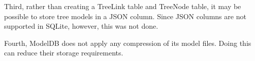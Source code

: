 Third, rather than creating a TreeLink table and TreeNode table, it may be possible to store
tree models in a JSON column. Since JSON columns are not supported in SQLite, however, this was
not done.

Fourth, ModelDB does not apply any compression of its model files. Doing this can reduce their storage requirements.
